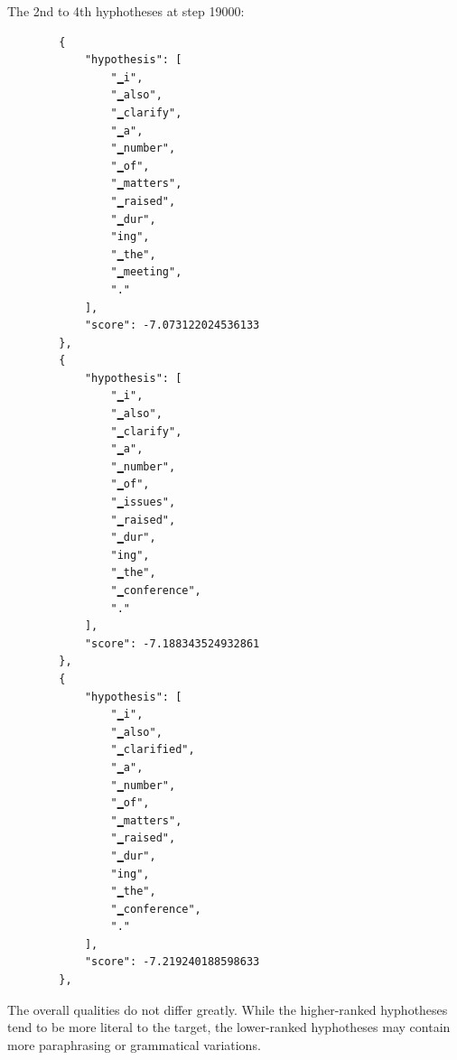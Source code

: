 \begin{parts}
\begin{subparts}
        \ifans{} The 2nd to 4th hyphotheses at step 19000:
        \begin{lstlisting}
        {
            "hypothesis": [
                "▁i",
                "▁also",
                "▁clarify",
                "▁a",
                "▁number",
                "▁of",
                "▁matters",
                "▁raised",
                "▁dur",
                "ing",
                "▁the",
                "▁meeting",
                "."
            ],
            "score": -7.073122024536133
        },
        {
            "hypothesis": [
                "▁i",
                "▁also",
                "▁clarify",
                "▁a",
                "▁number",
                "▁of",
                "▁issues",
                "▁raised",
                "▁dur",
                "ing",
                "▁the",
                "▁conference",
                "."
            ],
            "score": -7.188343524932861
        },
        {
            "hypothesis": [
                "▁i",
                "▁also",
                "▁clarified",
                "▁a",
                "▁number",
                "▁of",
                "▁matters",
                "▁raised",
                "▁dur",
                "ing",
                "▁the",
                "▁conference",
                "."
            ],
            "score": -7.219240188598633
        },
        \end{lstlisting}
        The overall qualities do not differ greatly. While the higher-ranked hyphotheses tend to be more literal to the target, the lower-ranked hyphotheses may contain more paraphrasing or grammatical variations.
    
    \end{subparts}

    
    

\end{parts}

\newpage

